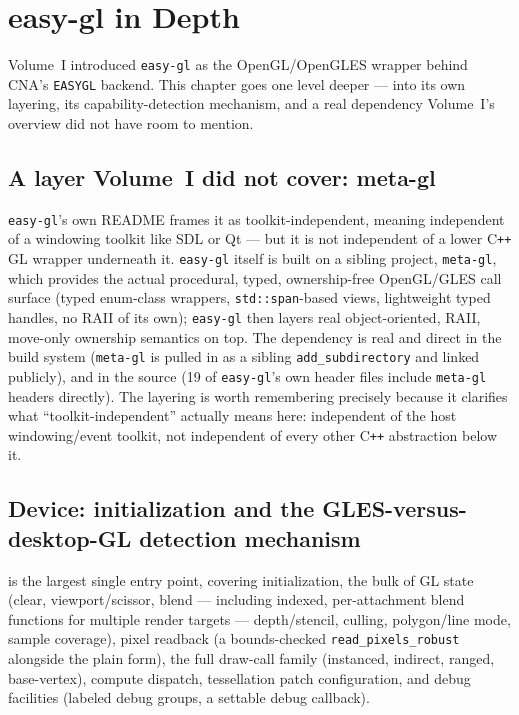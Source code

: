 \chapter{easy-gl in Depth}
\label{ch:easygl-deep-dive}

Volume~I introduced \texttt{easy-gl} as the OpenGL/OpenGLES wrapper behind CNA's
\texttt{EASYGL} backend. This chapter goes one level deeper --- into its own layering, its
capability-detection mechanism, and a real dependency Volume~I's overview did not have room
to mention.

\section{A layer Volume~I did not cover: meta-gl}

\texttt{easy-gl}'s own README frames it as toolkit-independent, meaning independent of a
windowing toolkit like SDL or Qt --- but it is not independent of a lower C\texttt{++} GL
wrapper underneath it. \texttt{easy-gl} itself is built on a sibling project,
\texttt{meta-gl}, which provides the actual procedural, typed, ownership-free OpenGL/GLES
call surface (typed enum-class wrappers, \texttt{std::span}-based views, lightweight typed
handles, no RAII of its own); \texttt{easy-gl} then layers real object-oriented, RAII,
move-only ownership semantics on top. The dependency is real and direct in the build system
(\texttt{meta-gl} is pulled in as a sibling \texttt{add\_subdirectory} and linked publicly),
and in the source (19 of \texttt{easy-gl}'s own header files include \texttt{meta-gl} headers
directly). The layering is worth remembering precisely because it clarifies what
``toolkit-independent'' actually means here: independent of the host windowing/event toolkit,
not independent of every other C\texttt{++} abstraction below it.

\section{Device: initialization and the GLES-versus-desktop-GL detection mechanism}

 is the largest single entry point, covering initialization, the
bulk of GL state (clear, viewport/scissor, blend --- including indexed, per-attachment blend
functions for multiple render targets --- depth/stencil, culling, polygon/line mode, sample
coverage), pixel readback (a bounds-checked \texttt{read\_pixels\_robust} alongside the plain
form), the full draw-call family (instanced, indirect, ranged, base-vertex), compute
dispatch, tessellation patch configuration, and debug facilities (labeled debug groups, a
settable debug callback).


